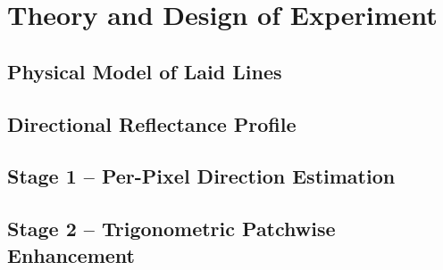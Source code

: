 \section{Theory and Design of Experiment}
\label{sec:theory}


\subsection{Physical Model of Laid Lines}
\label{sec:theory:physical}

\subsection{Directional Reflectance Profile}
\label{sec:theory:drp}

\subsection{Stage 1 -- Per-Pixel Direction Estimation}
\label{sec:theory:direction}

\subsection{Stage 2 -- Trigonometric Patchwise Enhancement}
\label{sec:theory:trigmask}

